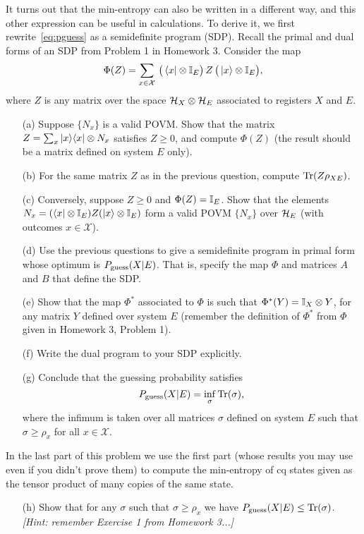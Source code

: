 \documentclass[12pt]{article}
\begin{document}
\begin{enumerate}
It turns out that the min-entropy can also be written in a different way, and this other expression can be useful in calculations. To derive it, we first rewrite~\eqref{eq:pguess} as a semidefinite program (SDP). Recall the primal and dual forms of an SDP from Problem 1 in Homework 3.  Consider the map 
$$\Phi(Z) = \sum_{x\in\mathcal{X}} \,\big(\bra{x} \otimes \mathbb{I}_E\big) \,Z\, \big(\ket{x}\otimes\mathbb{I}_E\big),$$
where $Z$ is any matrix over the space $\mathcal{H}_X\otimes \mathcal{H}_E$ associated to registers $X$ and $E$. 
\begin{enumerate}
\item[(a)] Suppose $\{N_x\}$ is a valid POVM. Show that the matrix $Z = \sum_x \ket{x}\!\bra{x}\otimes N_x$ satisfies $Z\geq 0 $, and compute $\Phi(Z)$ (the result should be a matrix defined on system $E$ only).
\item[(b)] For the same matrix $Z$ as in the previous question, compute $\mathrm{Tr}(Z\rho_{XE})$. 
\item[(c)] Conversely, suppose $Z \geq 0$ and $\Phi(Z) = \mathbb{I}_E$. Show that the elements $N_x = (\bra{x} \otimes \mathbb{I}_E) Z (\ket{x}\otimes\mathbb{I}_E)$ form a valid POVM $\{N_x\}$ over $\mathcal{H}_E$ (with outcomes $x\in \mathcal{X}$).  
\item[(d)] Use the previous questions to give a semidefinite program in primal form whose optimum is $P_{\rm guess}(X|E)$. That is, specify the map $\Phi$ and matrices $A$ and $B$ that define the SDP.  
\item[(e)] Show that the map $\Phi^*$ associated to $\Phi$ is such that $\Phi^*(Y) = \mathbb{I}_X \otimes Y$, for any matrix $Y$ defined over system $E$ (remember the definition of $\Phi^*$ from $\Phi$ given in Homework 3, Problem 1).
\item[(f)] Write the dual program to your SDP explicitly. 
\item[(g)] Conclude that the guessing probability satisfies
$$ P_{\rm guess}(X|E) = \inf_\sigma \mathrm{Tr}(\sigma),$$
 where the infimum is taken over all matrices $\sigma$ defined on system $E$ such that $\sigma \geq \rho_x$ for all $x\in\mathcal{X}$. 
\end{enumerate}
In the last part of this problem we use the first part (whose results you may use even if you didn't prove them) to compute the min-entropy of cq states given as the tensor product of many copies of the same state. 
\begin{enumerate}
\item[(h)] Show that for any $\sigma$ such that $\sigma \geq \rho_x$ we have $P_{\rm guess}(X|E)\leq \mathrm{Tr}(\sigma)$. \emph{[Hint: remember Exercise 1 from Homework 3...]}

\end{enumerate}
\end{enumerate}
\end{document}
